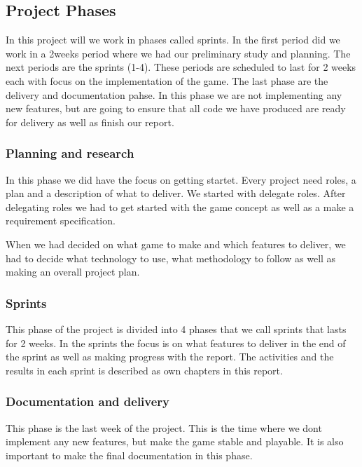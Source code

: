 \clearpage
\subsection{Project Phases}

In this project will we work in phases called sprints.
In the first period did we work in a 2weeks period where we had our preliminary study and planning. The next periods are the sprints (1-4). These periods are scheduled to last for 2 weeks each with focus on the implementation of the game. The last phase are the delivery and documentation pahse. In this phase we are not implementing any new features, but are going to ensure that all code we have produced are ready for delivery as well as finish our report.

\subsubsection{Planning and research}
In this phase we did have the focus on getting startet. Every project need roles, a plan and a description of what to deliver. We started with delegate roles. After delegating roles we had to get started with the game concept as well as a make a requirement specification. 

When we had decided on what game to make and which features to deliver, we had to decide what technology to use, what methodology to follow as well as making an overall project plan. 

\subsubsection{Sprints}
This phase of the project is divided into 4 phases that we call sprints that lasts for 2 weeks.
In the sprints the focus is on what features to deliver in the end of the sprint as well as 
making progress with the report. The activities and the results in each sprint is described as
own chapters in this report.

\subsubsection{Documentation and delivery}
This phase is the last week of the project. This is the time where we dont implement any new features, 
but make the game stable and playable. It is also important to make the final documentation in this phase.
